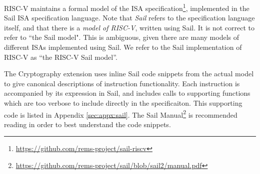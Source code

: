 
RISC-V maintains a formal model of the ISA specification\footnote{\url{https://github.com/rems-project/sail-riscv}}, implemented
in the Sail ISA specification language\cite{sail}.
Note that {\em Sail} refers to the specification language itself,
and that there is a {\em model of RISC-V}, written using Sail.
It is not correct to refer to ``the Sail model".
This is ambiguous, given there are many models of different ISAs implemented
using Sail. We refer to the Sail implementation of RISC-V as
``the RISC-V Sail model''.

The Cryptography extension uses inline Sail code snippets from the
actual model to give canonical descriptions of instruction
functionality.
Each instruction is accompanied by its expression in Sail, and includes
calls to supporting functions which are too verbose to include directly
in the specificaiton.
This supporting code is listed in Appendix \ref{sec:appx:sail}.
The Sail Manual\footnote{\url{https://github.com/rems-project/sail/blob/sail2/manual.pdf}} is recommended reading in order to
best understand the code snippets.

